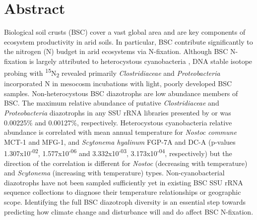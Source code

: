 \section{Abstract}
Biological soil crusts (BSC) cover a vast global area and are key components of ecosystem productivity in arid soils. In particular, BSC contribute significantly to the nitrogen (N) budget in arid ecosystems via N-fixation. Although BSC N-fixation is largely attributed to heterocystous cyanobacteria \cite{Yeager, 14766579, Yeager_2012}, DNA stable isotope probing with \textsuperscript{15}N\textsubscript{2} revealed primarily \textit{Clostridiaceae} and \textit{Proteobacteria} incorporated N in mesocosm incubations with light, poorly developed BSC samples. Non-heterocystous BSC diazotrophs are low abundance members of BSC. The maximum relative abundance of putative \textit{Clostridiaceae} and \textit{Proteobacteria} diazotrophs in any SSU rRNA libraries presented by \citet{Garcia_Pichel_2013} or \citet{Steven_2013} was 0.00225\% and 0.00127\%, respectively. Heterocystous cyanobacteria relative abundance is correlated with mean annual temperature for \textit{Nostoc commune} MCT-1 and MFG-1, and \textit{Scytonema hyalinum} FGP-7A and DC-A (p-values 1.307x10\textsuperscript{-02}, 1.577x10\textsuperscript{-06} and 3.332x10\textsuperscript{-03}, 3.173x10\textsuperscript{-04}, respectively) but the direction of the correlation is different for \textit{Nostoc} (decreasing with temperature) and \textit{Scytonema} (increasing with temperature) types. Non-cyanobacterial diazotrophs have not been sampled sufficiently yet in existing BSC SSU rRNA sequence collections to diagnose their temperature relationships or geographic scope. Identifying the full BSC diazotroph diversity is an essential step towards predicting how climate change and disturbance will and do affect BSC N-fixation.
